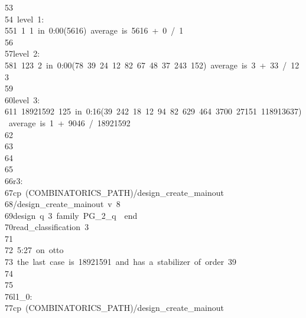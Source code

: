 \begin{tabbing}
53\>\\[0pt]
54\>\ level\ 1:\\[0pt]
55\>1\ 1\ 1\ in\ 0:00(5616)\ average\ is\ 5616\ +\ 0\ /\ 1\\[0pt]
56\>\\[0pt]
57\>level\ 2:\\[0pt]
58\>1\ 123\ 2\ in\ 0:00(78\ 39\ 24\ 12\ 82\ 67\ 48\ 37\ 243\ 152)\ average\ is\ 3\ +\ 33\ /\ 123\\[0pt]
59\>\\[0pt]
60\>level\ 3:\\[0pt]
61\>1\ 18921592\ 125\ in\ 0:16(39\ 242\ 18\ 12\ 94\ 82\ 629\ 464\ 3700\ 27151\ 118913637)\ average\ is\ 1\ +\ 9046\ /\ 18921592\\[0pt]
62\>\\[0pt]
63\>\\[0pt]
64\>\\[0pt]
65\>\\[0pt]
66\>r3:\\[0pt]
67\>\>cp\ (COMBINATORICS\_PATH)/design\_create\_mainout\ \\[0pt]
68\>\>/design\_create\_mainout\ v\ 8\ \ \\[0pt]
69\>\>\>design\ q\ 3\ family\ PG\_2\_q\ \ end\ \\[0pt]
70\>\>\>read\_classification\ 3\\[0pt]
71\>\\[0pt]
72\>\ 5:27\ on\ otto\\[0pt]
73\>\ the\ last\ case\ is\ 18921591\ and\ has\ a\ stabilizer\ of\ order\ 39\\[0pt]
74\>\\[0pt]
75\>\\[0pt]
76\>l1\_0:\\[0pt]
77\>\>cp\ (COMBINATORICS\_PATH)/design\_create\_mainout\ \\[0pt]

\end{tabbing}

